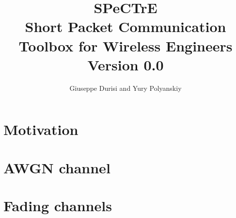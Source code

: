 \documentclass[a4paper,11p]{memoir}
\begin{document}
\title{SPeCTrE\\
Short Packet Communication Toolbox for Wireless Engineers\\[1cm]
Version 0.0}

\author{Giuseppe Durisi and Yury Polyanskiy}
\maketitle

\begin{abstract}
  
\end{abstract}
\newpage
\tableofcontents

\newpage
\chapter{Motivation}
\chapter{AWGN channel}
\chapter{Fading channels}


\end{document}
